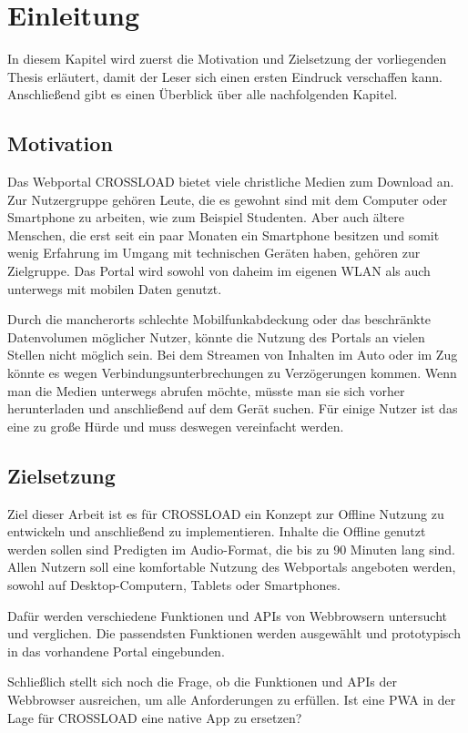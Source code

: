 \chapter{Einleitung}
\label{Kap1}
In diesem Kapitel wird zuerst die Motivation und Zielsetzung der vorliegenden Thesis erläutert, damit der Leser sich einen ersten Eindruck verschaffen kann. Anschließend gibt es einen Überblick über alle nachfolgenden Kapitel.

\section{Motivation}
Das Webportal CROSSLOAD bietet viele christliche Medien zum Download an. Zur Nutzergruppe gehören Leute, die es gewohnt sind mit dem Computer oder Smartphone zu arbeiten, wie zum Beispiel Studenten. Aber auch ältere Menschen, die erst seit ein paar Monaten ein Smartphone besitzen und somit wenig Erfahrung im Umgang mit technischen Geräten haben, gehören zur Zielgruppe. Das Portal wird sowohl von daheim im eigenen WLAN als auch unterwegs mit mobilen Daten genutzt.

Durch die mancherorts schlechte Mobilfunkabdeckung oder das beschränkte Datenvolumen möglicher Nutzer, könnte die Nutzung des Portals an vielen Stellen nicht möglich sein. Bei dem Streamen von Inhalten im Auto oder im Zug könnte es wegen Verbindungsunterbrechungen zu Verzögerungen kommen. Wenn man die Medien unterwegs abrufen möchte, müsste man sie sich vorher herunterladen und anschließend auf dem Gerät suchen. Für einige Nutzer ist das eine zu große Hürde und muss deswegen vereinfacht werden. 

\section{Zielsetzung}
Ziel dieser Arbeit ist es für CROSSLOAD ein Konzept zur Offline Nutzung zu entwickeln und anschließend zu implementieren. Inhalte die Offline genutzt werden sollen sind Predigten im Audio-Format, die bis zu 90 Minuten lang sind. Allen Nutzern soll eine komfortable Nutzung des Webportals angeboten werden, sowohl auf Desktop-Computern, Tablets oder Smartphones. 

Dafür werden verschiedene Funktionen und \acp{API} von Webbrowsern untersucht und verglichen. Die passendsten Funktionen werden ausgewählt und prototypisch in das vorhandene Portal eingebunden.

Schließlich stellt sich noch die Frage, ob die Funktionen und APIs der Webbrowser ausreichen, um alle Anforderungen zu erfüllen. Ist eine \ac{PWA} in der Lage für CROSSLOAD eine native App zu ersetzen?

